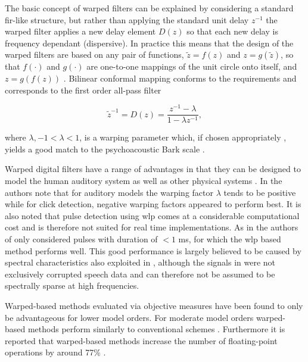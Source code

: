 The basic concept of warped filters can be explained by considering a standard \gls{fir}-like structure, but rather than applying the standard unit delay $z^{-1}$ the warped filter applies a new delay element $D(z)$ so that each new delay is frequency dependant (dispersive). In practice this means that the design of the warped filters are based on any pair of functions, $\tilde{z} = f(z)$ and $z = g(\tilde{z})$, so that $f(\cdot)$ and $g(\cdot)$ are one-to-one mappings of the unit circle onto itself, and $z = g\left( f(z) \right)$ \cite{Karjalainen1997}. Bilinear conformal mapping \cite{Brown1996} conforms to the requirements and corresponds to the first order all-pass filter

\begin{equation}\label{eq:Karjalainen1997}
\tilde{z}^{-1} = D(z) = \frac{z^{-1} - \lambda}{1 - \lambda z^{-1}},
\end{equation}

where $\lambda, -1 < \lambda < 1$, is a warping parameter which, if chosen appropriately \cite{Karjalainen1997}, yields a good match to the psychoacoustic Bark scale \cite{Smith1995}.

Warped digital filters have a range of advantages in that they can be designed to model the human auditory system as well as other physical systems \cite{Karjalainen1997}. In \cite{Esquef2002} the authors note that for auditory models the warping factor $\lambda$ tends to be positive while for click detection, negative warping factors appeared to perform best. It is also noted that pulse detection using \gls{wlp} comes at a considerable computational cost and is therefore not suited for real time implementations. As in \cite{Godsill1998book} the authors of \cite{Esquef2002} only considered pulses with duration of $<1$ ms, for which the \gls{wlp} based method performs well. This good performance is largely believed to be caused by spectral characteristics also exploited in \cite{Kasparis1993}\cite{US6795559}, although the signals in \cite{Esquef2002} were not exclusively corrupted speech data and can therefore not be assumed to be spectrally sparse at high frequencies.



Warped-based methods evaluated via objective measures have been found to only be advantageous for lower model orders. For moderate model orders warped-based methods perform similarly to conventional schemes \cite{Esquef2003}\cite{Esquef2003a}. Furthermore it is reported that warped-based methods increase the number of floating-point operations by around 77\% \cite{Esquef2003}.

